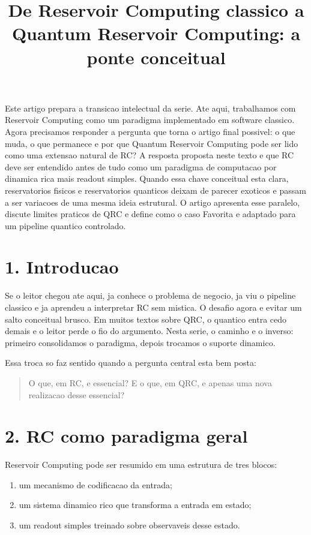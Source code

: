 \documentclass[12pt]{article}
\title{De Reservoir Computing classico a Quantum Reservoir Computing: a ponte conceitual}
\author{}
\providecommand{\tightlist}{%
  \setlength{\itemsep}{0pt}\setlength{\parskip}{0pt}}
\begin{document}
\maketitle

\begin{resumo}
Este artigo prepara a transicao intelectual da serie. Ate aqui, trabalhamos com Reservoir Computing como um paradigma implementado em software classico. Agora precisamos responder a pergunta que torna o artigo final possivel: o que muda, o que permanece e por que Quantum Reservoir Computing pode ser lido como uma extensao natural de RC? A resposta proposta neste texto e que RC deve ser entendido antes de tudo como um paradigma de computacao por dinamica rica mais readout simples. Quando essa chave conceitual esta clara, reservatorios fisicos e reservatorios quanticos deixam de parecer exoticos e passam a ser variacoes de uma mesma ideia estrutural. O artigo apresenta esse paralelo, discute limites praticos de QRC e define como o caso Favorita e adaptado para um pipeline quantico controlado.
\end{resumo}

\section{1. Introducao}\label{1-introducao}

Se o leitor chegou ate aqui, ja conhece o problema de negocio, ja viu o pipeline classico e ja aprendeu a interpretar RC sem mistica. O desafio agora e evitar um salto conceitual brusco. Em muitos textos sobre QRC, o quantico entra cedo demais e o leitor perde o fio do argumento. Nesta serie, o caminho e o inverso: primeiro consolidamos o paradigma, depois trocamos o suporte dinamico.

Essa troca so faz sentido quando a pergunta central esta bem posta:

\begin{quote}
O que, em RC, e essencial? E o que, em QRC, e apenas uma nova realizacao desse essencial?
\end{quote}

\section{2. RC como paradigma geral}\label{2-rc-como-paradigma-geral}

Reservoir Computing pode ser resumido em uma estrutura de tres blocos:

\begin{enumerate}
\def\labelenumi{\arabic{enumi}.}
\tightlist
\item
  um mecanismo de codificacao da entrada;
\item
  um sistema dinamico rico que transforma a entrada em estado;
\item
  um readout simples treinado sobre observaveis desse estado.
\end{enumerate}
\end{document}
